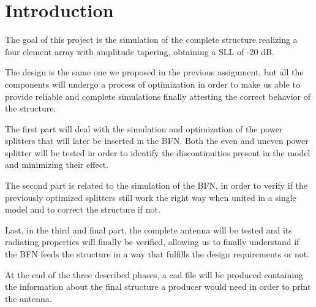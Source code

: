 \section{Introduction}
The goal of this project is the simulation of the complete structure realizing a four element array with amplitude tapering, obtaining a SLL of -20 dB.

\par\medskip
\noindent
The design is the same one we proposed in the previous assignment, but all the components will undergo a process of optimization in order to make us able to provide reliable and complete simulations finally attesting the correct behavior of the structure.

\par\medskip
\noindent
The first part will deal with the simulation and optimization of the power splitters that will later be inserted in the BFN. Both the even and uneven power splitter will be tested in order to identify the discontinuities present in the model and minimizing their effect.


\par\medskip
\noindent
The second part is related to the simulation of the BFN, in order to verify if the previously optimized splitters still work the right way when united in a single model and to correct the structure if not.


\par\medskip
\noindent
Last, in the third and final part, the complete antenna will be tested and its radiating properties will finally be verified, allowing us to finally understand if the BFN feeds the structure in a way that fulfills the design requirements or not.

\par\medskip
\noindent
At the end of the three described phases, a cad file will be produced containing the information about the final structure a producer would need in order to print the antenna.
